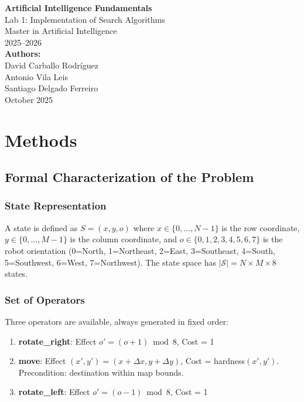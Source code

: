 \documentclass[11pt,a4paper]{article}
\begin{document}
\begin{titlepage}
    \centering
    \vspace*{2cm}
    {\LARGE\textbf{Artificial Intelligence Fundamentals}}\\[0.5cm]
    {\Large Lab 1: Implementation of Search Algorithms}\\[1.5cm]
    {\large Master in Artificial Intelligence}\\[0.3cm]
    {\large 2025--2026}\\[2cm]
    
    {\large\textbf{Authors:}}\\[0.3cm]
    {\large David Carballo Rodríguez}\\[0.2cm]
    {\large Antonio Vila Leis}\\[0.2cm]
    {\large Santiago Delgado Ferreiro}\\[1.5cm]
    
    {\large October 2025}
\end{titlepage}

\tableofcontents
\newpage

\section{Methods}

\subsection{Formal Characterization of the Problem}

\subsubsection{State Representation}
A state is defined as $S = (x, y, o)$ where $x \in \{0, \ldots, N-1\}$ is the row coordinate, $y \in \{0, \ldots, M-1\}$ is the column coordinate, and $o \in \{0, 1, 2, 3, 4, 5, 6, 7\}$ is the robot orientation (0=North, 1=Northeast, 2=East, 3=Southeast, 4=South, 5=Southwest, 6=West, 7=Northwest). The state space has $|\mathcal{S}| = N \times M \times 8$ states.

\subsubsection{Set of Operators}
Three operators are available, always generated in fixed order:
\begin{enumerate}[itemsep=0.2em]
    \item \textbf{rotate\_right}: Effect $o' = (o + 1) \bmod 8$, Cost = 1
    \item \textbf{move}: Effect $(x', y') = (x + \Delta x, y + \Delta y)$, Cost = hardness$(x', y')$. Precondition: destination within map bounds.
    \item \textbf{rotate\_left}: Effect $o' = (o - 1) \bmod 8$, Cost = 1
\end{enumerate}
\end{document}
